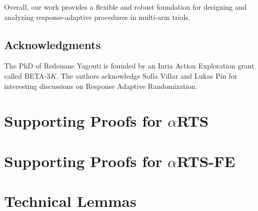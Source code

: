 \documentclass[11pt]{article}
\theoremstyle{plain}
\theoremstyle{definition}
\begin{document}
	Overall, our work provides a flexible and robust foundation for designing and analyzing response-adaptive procedures in multi-arm trials.
	
	\subsection*{Acknowledgments}
		The PhD of Redouane Yagouti is founded by an Inria Action Exploration grant called BETA-3$K$. The authors acknowledge Sof\'ia Villar and Lukas Pin for interesting discussions on Response Adaptive Randomization.

	
	
	
	\newpage
	\begin{appendix}
		\section{Supporting Proofs for $\alpha$RTS}\label{appnA}
		
		
		\section{Supporting Proofs for $\alpha$RTS-FE}\label{appnB}
		
		
		\section{Technical Lemmas}\label{appnC}
		
	\end{appendix}
	
	
\end{document}
